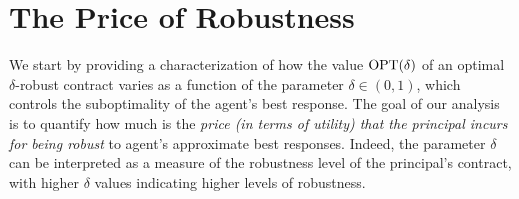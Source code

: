 \section{The Price of Robustness}\label{sec:characterizations}

We start by providing a characterization of how the value $\textnormal{OPT}(\delta)$ of an optimal $\delta$-robust contract varies as a function of the parameter $\delta \in (0,1)$, which controls the suboptimality of the agent's best response.
%
The goal of our analysis is to quantify how much is the \emph{price (in terms of utility) that the principal incurs for being robust} to agent's approximate best responses. 
%
Indeed, the parameter $\delta$ can be interpreted as a measure of the robustness level of the principal's contract, with higher $\delta$ values indicating higher levels of robustness.

